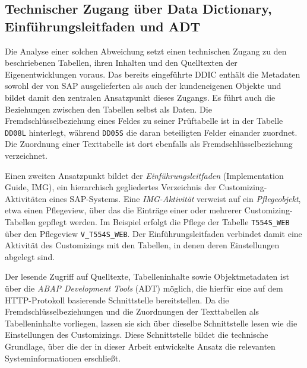 \subsection{Technischer Zugang über Data Dictionary, Einführungsleitfaden und ADT}
\label{subsec:zugang}

Die Analyse einer solchen Abweichung setzt einen technischen Zugang zu den beschriebenen Tabellen, ihren Inhalten und den Quelltexten der Eigenentwicklungen voraus. Das bereits eingeführte DDIC enthält die Metadaten sowohl der von SAP ausgelieferten als auch der kundeneigenen Objekte und bildet damit den zentralen Ansatzpunkt dieses Zugangs. Es führt auch die Beziehungen zwischen den Tabellen selbst als Daten. Die Fremdschlüsselbeziehung eines Feldes zu seiner Prüftabelle ist in der Tabelle \texttt{DD08L} hinterlegt, während \texttt{DD05S} die daran beteiligten Felder einander zuordnet. Die Zuordnung einer Texttabelle ist dort ebenfalls als Fremdschlüsselbeziehung verzeichnet. %

Einen zweiten Ansatzpunkt bildet der \emph{Einführungsleitfaden} (Implementation Guide, IMG), ein hierarchisch gegliedertes Verzeichnis der Customizing-Aktivitäten eines SAP-Systems. Eine \emph{IMG-Aktivität} verweist auf ein \emph{Pflegeobjekt}, etwa einen Pflegeview, über das die Einträge einer oder mehrerer Customizing-Tabellen gepflegt werden. %
Im Beispiel erfolgt die Pflege der Tabelle \texttt{T554S\_WEB} über den Pflegeview \texttt{V\_T554S\_WEB}. Der Einführungsleitfaden verbindet damit eine Aktivität des Customizings mit den Tabellen, in denen deren Einstellungen abgelegt sind.

Der lesende Zugriff auf Quelltexte, Tabelleninhalte sowie Objektmetadaten ist über die \emph{ABAP Development Tools} (ADT) möglich, die hierfür eine auf dem HTTP-Protokoll basierende Schnittstelle bereitstellen. Da die Fremdschlüsselbeziehungen und die Zuordnungen der Texttabellen als Tabelleninhalte vorliegen, lassen sie sich über dieselbe Schnittstelle lesen wie die Einstellungen des Customizings. Diese Schnittstelle bildet die technische Grundlage, über die der in dieser Arbeit entwickelte Ansatz die relevanten Systeminformationen erschließt.


